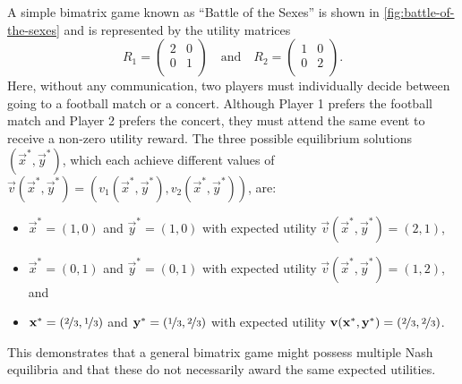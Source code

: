     A simple bimatrix game known as ``Battle of the Sexes'' is shown in \autoref{fig:battle-of-the-sexes} and is represented by the utility matrices
    \[
        R_1
            =
            \begin{pmatrix}
                2 & 0 \\
                0 & 1 \\
            \end{pmatrix}
        \quad\text{and}\quad
        R_2
            =
            \begin{pmatrix}
                1 & 0 \\
                0 & 2 \\
            \end{pmatrix}.
    \]
    Here, without any communication, two players must individually decide between going to a football match or a concert.
    Although Player 1 prefers the football match and Player 2 prefers the concert, they must attend the same event to receive a non-zero utility reward.
    The three possible equilibrium solutions $(\vec{x}^*, \vec{y}^*)$, which each achieve different values of $\vec{v}(\vec{x}^*, \vec{y}^*) = (v_1(\vec{x}^*, \vec{y}^*), v_2(\vec{x}^*, \vec{y}^*))$, are:
    \begin{itemize}
        \item $\vec{x}^* = (1, 0)$ and $\vec{y}^* = (1, 0)$ with expected utility $\vec{v}(\vec{x}^*, \vec{y}^*) = (2, 1)$,
        \item $\vec{x}^* = (0, 1)$ and $\vec{y}^* = (0, 1)$ with expected utility $\vec{v}(\vec{x}^*, \vec{y}^*) = (1, 2)$, and
        \item $\vec{x}^* = (\nicefrac{2}{3}, \nicefrac{1}{3})$ and $\vec{y}^* = (\nicefrac{1}{3}, \nicefrac{2}{3})$ with expected utility $\vec{v}(\vec{x}^*, \vec{y}^*) = (\nicefrac{2}{3}, \nicefrac{2}{3})$.
    \end{itemize}
    This demonstrates that a general bimatrix game might possess multiple Nash equilibria and that these do not necessarily award the same expected utilities.

